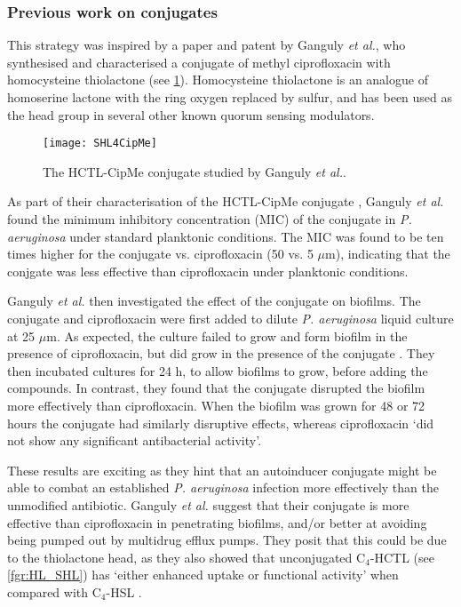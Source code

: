\subsubsection{Previous work on conjugates\label{sec:prev}}

This strategy was inspired by a paper\cite{Ganguly2011} and patent\cite{Iyer2012} by Ganguly \textit{et al.}, who synthesised and characterised a conjugate  of methyl ciprofloxacin with homocysteine thiolactone (see \ref{fgr:SHL4CipMe}). Homocysteine thiolactone is an analogue of homoserine lactone with the ring oxygen replaced by sulfur, and has been used as the head group in several other known quorum sensing modulators\cite{Eberhard1986,Schaefer1996,Passador1996,Smith2003,Chhabra1993,McInnis2011,Geske2007,Janssens2007}.


\begin{figure}[H]
	\begin{center}
		\texttt{[image: SHL4CipMe]}
		\caption{The HCTL-CipMe conjugate  studied by Ganguly \textit{et al.}\cite{Ganguly2011,Iyer2012}.\label{fgr:SHL4CipMe}}
	\end{center}
\end{figure}


As part of their characterisation of the HCTL-CipMe conjugate , Ganguly \textit{et al.} found the minimum inhibitory concentration (MIC) of the conjugate in \textit{P. aeruginosa} under standard planktonic conditions. 
The MIC was found to be ten times higher for the conjugate vs. ciprofloxacin (50 vs. 5 $\mu$m), indicating that the conjgate was less effective than ciprofloxacin under planktonic conditions. 

Ganguly \textit{et al.} then investigated the effect of the conjugate on biofilms. 
The conjugate and ciprofloxacin were first added to dilute \textit{P. aeruginosa} liquid culture at 25 $\mu$m. 
As expected, the culture failed to grow and form biofilm in the presence of ciprofloxacin, but did grow in the presence of the conjugate . 
They then incubated cultures for 24 h, to allow biofilms to grow, before adding the compounds. In contrast, they found that the conjugate  disrupted the biofilm more effectively than ciprofloxacin. 
When the biofilm was grown for 48 or 72 hours the conjugate had similarly disruptive effects, whereas ciprofloxacin `did not show any significant antibacterial activity'.

These results are exciting as they hint that an autoinducer conjugate might be able to combat an established \textit{P. aeruginosa} infection more effectively than the unmodified antibiotic. 
Ganguly \textit{et al.} suggest that their conjugate is more effective than ciprofloxacin in penetrating biofilms, and/or better at avoiding being pumped out by multidrug efflux pumps. They posit that this could be due to the thiolactone head, as they also showed that unconjugated C$_4$-HCTL  (see \ref{fgr:HL_SHL}) has `either enhanced uptake or functional activity' when compared with C$_4$-HSL . 

